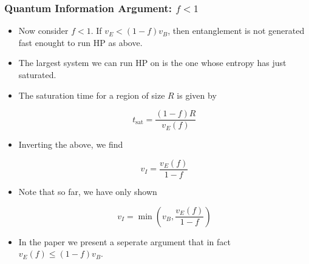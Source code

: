 \documentclass[10pt,aspectratio=169]{beamer}
\begin{document}
\begin{frame}
\frametitle{Quantum Information Argument: $f<1$}


\begin{itemize}

\item Now consider $f<1$. If $v_E < (1-f) v_B$, then entanglement is not generated fast enought to run HP as above.

\item The largest system we can run HP on is the one whose entropy has just saturated.

\item The saturation time for a region of size $R$ is given by

\begin{equation}
t_{\text{sat}} = \frac{(1-f) R}{v_E(f)} 
\end{equation}

\item Inverting the above, we find

\begin{equation}
v_I = \frac{v_E(f)}{1-f}
\end{equation}

\item Note that so far, we have only shown

\begin{equation}
v_I = \min \left( v_B, \frac{v_E(f)}{1-f} \right)
\end{equation}

\item In the paper we present a seperate argument that in fact $v_E(f) \leq (1-f) v_B$. 

\end{itemize}

%

    
    


\end{frame}
\end{document}
